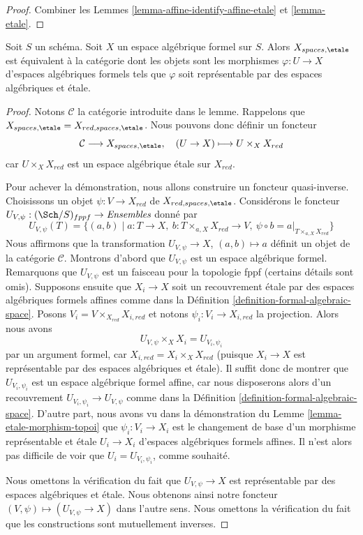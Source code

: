 \begin{proof}
Combiner les Lemmes \ref{lemma-affine-identify-affine-etale} et \ref{lemma-etale}.
\end{proof}

\begin{lemma}
\label{lemma-identify-spaces-etale}
Soit $S$ un schéma. Soit $X$ un espace algébrique formel sur $S$.
Alors $X_{spaces, \etale}$ est équivalent à la catégorie dont les objets
sont les morphismes $\varphi : U \to X$ d'espaces algébriques formels tels que
$\varphi$ soit représentable par des espaces algébriques et \'etale.
\end{lemma}

\begin{proof}
Notons $\mathcal{C}$ la catégorie introduite dans le lemme.
Rappelons que $X_{spaces, \etale} = X_{red, spaces, \etale}$.
Nous pouvons donc définir un foncteur
$$
\mathcal{C} \longrightarrow X_{spaces, \etale},\quad
(U \to X) \longmapsto U \times_X X_{red}
$$
car $U \times_X X_{red}$ est un espace algébrique \'etale sur $X_{red}$.

\medskip\noindent
Pour achever la démonstration, nous allons construire un foncteur quasi-inverse.
Choisissons un objet $\psi : V \to X_{red}$ de $X_{red, spaces, \etale}$.
Considérons le foncteur
$U_{V, \psi} : (\Sch/S)_{fppf} \to \textit{Ensembles}$ donné par
$$
U_{V, \psi}(T) = \{(a, b) \mid
a : T \to X,
\ b : T \times_{a, X} X_{red} \to V,
\ \psi \circ b = a|_{T \times_{a, X} X_{red}}\}
$$
Nous affirmons que la transformation $U_{V, \psi} \to X$, $(a, b) \mapsto a$
définit un objet de la catégorie $\mathcal{C}$.
Montrons d'abord que $U_{V, \psi}$ est un espace algébrique formel.
Remarquons que $U_{V, \psi}$ est un faisceau pour la topologie fppf (certains détails
sont omis). Supposons ensuite que $X_i \to X$ soit un recouvrement \'etale par des
espaces algébriques formels affines comme dans la
Définition \ref{definition-formal-algebraic-space}.
Posons $V_i = V \times_{X_{red}} X_{i, red}$ et notons
$\psi_i : V_i \to X_{i, red}$ la projection. Alors 
nous avons
$$
U_{V, \psi} \times_X X_i = U_{V_i, \psi_i}
$$
par un argument formel, car $X_{i, red} = X_i \times_X X_{red}$
(puisque $X_i \to X$ est représentable par des espaces algébriques et \'etale).
Il suffit donc de montrer que $U_{V_i, \psi_i}$ est un
espace algébrique formel affine, car nous disposerons alors
d'un recouvrement $U_{V_i, \psi_i} \to U_{V, \psi}$ comme dans la
Définition \ref{definition-formal-algebraic-space}.
D'autre part, nous avons vu dans la démonstration du
Lemme \ref{lemma-etale-morphism-topoi}
que $\psi_i : V_i \to X_i$ est le changement de
base d'un morphisme représentable et \'etale
$U_i \to X_i$ d'espaces algébriques formels affines.
Il n'est alors pas difficile de voir que $U_i = U_{V_i, \psi_i}$,
comme souhaité.

\medskip\noindent
Nous omettons la vérification du fait que $U_{V, \psi} \to X$
est représentable par des espaces algébriques et \'etale.
Nous obtenons ainsi notre foncteur $(V, \psi) \mapsto (U_{V, \psi} \to X)$
dans l'autre sens.
Nous omettons la vérification du fait que les constructions
sont mutuellement inverses.
\end{proof}

